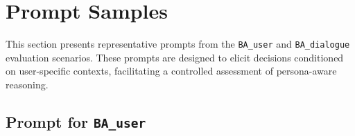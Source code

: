 \documentclass[acmlarge]{acmart}
\begin{document}






\section{Prompt Samples}

This section presents representative prompts from the \texttt{BA\_user} and \texttt{BA\_dialogue} evaluation scenarios. These prompts are designed to elicit decisions conditioned on user-specific contexts, facilitating a controlled assessment of persona-aware reasoning.

\subsection{Prompt for \texttt{BA\_user}}
\label{appendix:prompt_ba_user}
\end{document}
